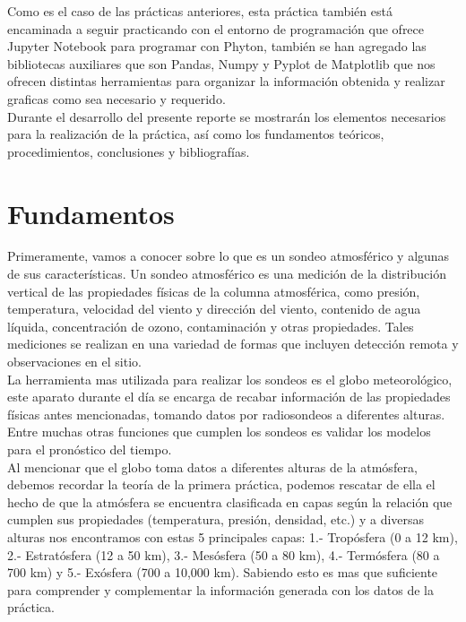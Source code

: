 \documentclass[12pt]{article}
\begin{document}
Como es el caso de las prácticas anteriores, esta práctica también está encaminada a seguir practicando con el entorno de programación que ofrece Jupyter Notebook para programar con Phyton, también se han agregado las bibliotecas auxiliares que son Pandas, Numpy y Pyplot de Matplotlib que nos ofrecen distintas herramientas para organizar la información obtenida y realizar graficas como sea necesario y requerido.\\

Durante el desarrollo del presente reporte se mostrarán los elementos necesarios para la realización de la práctica, así como los fundamentos teóricos, procedimientos, conclusiones y bibliografías.

\section*{Fundamentos}

Primeramente, vamos a conocer sobre lo que es un sondeo atmosférico y algunas de sus características. Un sondeo atmosférico es una medición de la distribución vertical de las propiedades físicas de la columna atmosférica, como presión, temperatura, velocidad del viento y dirección del viento, contenido de agua líquida, concentración de ozono, contaminación y otras propiedades. Tales mediciones se realizan en una variedad de formas que incluyen detección remota y observaciones en el sitio.\\

La herramienta mas utilizada para realizar los sondeos es el globo meteorológico, este aparato durante el día se encarga de recabar información de las propiedades físicas antes mencionadas, tomando datos por radiosondeos a diferentes alturas. Entre muchas otras funciones que cumplen los sondeos es validar los modelos para el pronóstico del tiempo.\\

Al mencionar que el globo toma datos a diferentes alturas de la atmósfera, debemos recordar la teoría de la primera práctica, podemos rescatar de ella el hecho de que la atmósfera se encuentra clasificada en capas según la relación que cumplen sus propiedades (temperatura, presión, densidad, etc.) y a diversas alturas nos encontramos con estas 5 principales capas: 1.- Tropósfera (0 a 12 km), 2.- Estratósfera (12 a 50 km), 3.- Mesósfera (50 a 80 km), 4.- Termósfera (80 a 700 km) y 5.- Exósfera (700 a 10,000 km). Sabiendo esto es mas que suficiente para comprender y complementar la información generada con los datos de la práctica.
\end{document}
